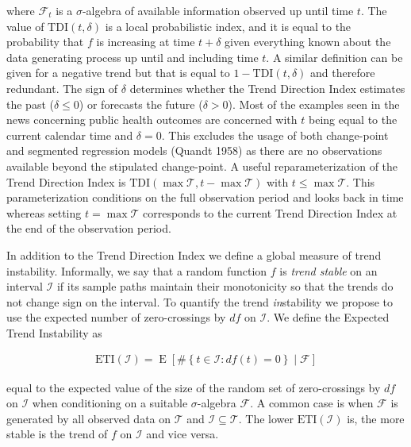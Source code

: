 \documentclass[11pt,]{article}
\DeclareMathOperator*{\E}{E}
\theoremstyle{nonumberplain}
\begin{document}
where \(\mathcal{F}_t\) is a \(\sigma\)-algebra of available information
observed up until time \(t\). The value of \(\mathrm{TDI}(t, \delta)\)
is a local probabilistic index, and it is equal to the probability that
\(f\) is increasing at time \(t + \delta\) given everything known about
the data generating process up until and including time \(t\). A similar
definition can be given for a negative trend but that is equal to
\(1 - \mathrm{TDI}(t, \delta)\) and therefore redundant. The sign of
\(\delta\) determines whether the Trend Direction Index estimates the
past (\(\delta \leq 0\)) or forecasts the future (\(\delta > 0\)). Most
of the examples seen in the news concerning public health outcomes are
concerned with \(t\) being equal to the current calendar time and
\(\delta = 0\). This excludes the usage of both change-point and
segmented regression models (Quandt 1958) as there are no observations
available beyond the stipulated change-point. A useful
reparameterization of the Trend Direction Index is
\(\mathrm{TDI}(\max \mathcal{T}, t - \max \mathcal{T})\) with
\(t \leq \max \mathcal{T}\). This parameterization conditions on the
full observation period and looks back in time whereas setting
\(t = \max \mathcal{T}\) corresponds to the current Trend Direction
Index at the end of the observation period.

In addition to the Trend Direction Index we define a global measure of
trend instability. Informally, we say that a random function \(f\) is
\textit{trend stable} on an interval \(\mathcal{I}\) if its sample paths
maintain their monotonicity so that the trends do not change sign on the
interval. To quantify the trend \emph{in}stability we propose to use the
expected number of zero-crossings by \(df\) on \(\mathcal{I}\). We
define the Expected Trend Instability as

\begin{align}
  \text{ETI}(\mathcal{I}) = \E\left[\#\left\{t \in \mathcal{I} : df(t) = 0\right\} \mid \mathcal{F}\right]\label{eq:ETIdef}
\end{align}

equal to the expected value of the size of the random set of
zero-crossings by \(df\) on \(\mathcal{I}\) when conditioning on a
suitable \(\sigma\)-algebra \(\mathcal{F}\). A common case is when
\(\mathcal{F}\) is generated by all observed data on \(\mathcal{T}\) and
\(\mathcal{I} \subseteq \mathcal{T}\). The lower
\(\text{ETI}(\mathcal{I})\) is, the more stable is the trend of \(f\) on
\(\mathcal{I}\) and vice versa.
\end{document}
